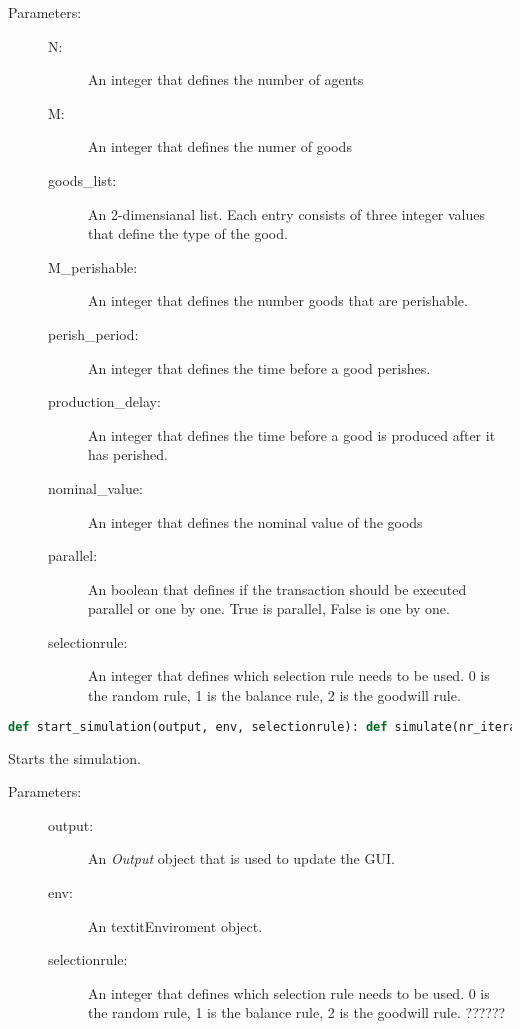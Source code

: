 \documentclass{article}
\begin{document}
\begin{description}
  \item[Parameters:] \hfill
	\begin{description}
  		\item[N:] An integer that defines the number of agents
		\item[M:] An integer that defines the numer of goods
		\item[goods\_list:] An 2-dimensianal list. Each entry consists of three integer values that define the type of the good.
		\item[M\_perishable:] An integer that defines the number goods that are perishable.
		\item[perish\_period:] An integer that defines the time before a good perishes.
		\item[production\_delay:] An integer that defines the time before a good is produced after it has perished.
		\item[nominal\_value:] An integer that defines the nominal value of the goods
		\item[parallel:] An boolean that defines if the transaction should be executed parallel or one by one. True is parallel, False is one by one.
		\item[selectionrule:] An integer that defines which selection rule needs to be used. 0 is the random rule, 1 is the balance rule, 2 is the goodwill rule.
	\end{description}
\end{description}

\begin{lstlisting}[language=Python]
def start_simulation(output, env, selectionrule): def simulate(nr_iterations, env, selectionrule, output):
\end{lstlisting}
Starts the simulation.

\begin{description}
  \item[Parameters:] \hfill
	\begin{description}
  		\item[output:] An \textit{Output} object that is used to update the GUI.
		\item[env:] An textit{Enviroment} object.
		\item[selectionrule:]  An integer that defines which selection rule needs to be used. 0 is the random rule, 1 is the balance rule, 2 is the goodwill rule. ??????
	\end{description}
\end{description}
\end{document}
